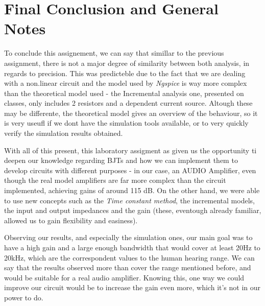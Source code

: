 \section{Final Conclusion and General Notes}
\label{sec:conclusion}
 To conclude this assignement, we can say that simillar to the previous assignment, there is not a major degree of similarity between both analysis, in regards to precision. This was predicteble due to the fact that we are dealing with a non.linear circuit and the model used by \textit{Ngspice} is way more complex than the theoretical model used - the Incremental analysis one, presented on classes, only includes 2 resistors and a dependent current source. Altough these may be differente, the theoretical model gives an overview of the behaviour, so it is very useufl if we dont have the simulation tools available, or to very quickly verify the simulation results obtained.

With all of this present, this laboratory assigment as given us the opportunity ti deepen our knowledge regarding BJTs and how we can implement them to develop circuits with different purposes - in our case, an AUDIO Amplifier, even though the real model amplifiers are far more complex than the circuit implemented, achieving gains of around 115 dB. On the other hand, we were able to use new concepts such as the \textit{Time constant method}, the incremental models, the input and output impedances and the gain (these, eventough already familiar, allowed us to gain flexibility and easiness).

Observing our results, and especially the simulation ones, our main goal was to have a high gain and a large enough bandwidth that would cover at least 20Hz to 20kHz, which are the correspondent values to the human hearing range. We can say that the results observed more than cover the range mentioned before, and would be suitable for a real audio amplifier. Knowing this, one way we could improve our circuit would be to increase the gain even more, which it's not in our power to do.

